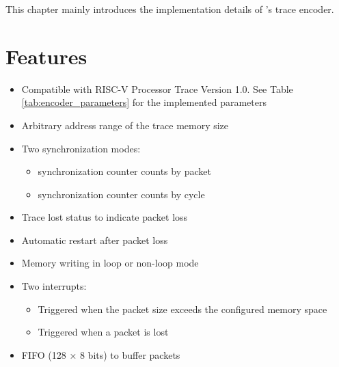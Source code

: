 \documentclass[main\_\_EN.tex]{subfiles}
\begin{document}
This chapter mainly introduces the implementation details of \chipname{}'s trace encoder.


\section{Features}
\label{sec:riscvtracenc-features}

\begin{itemize}
    \item Compatible with RISC-V Processor Trace Version 1.0. See Table \ref{tab:encoder_parameters} for the implemented parameters
    \item Arbitrary address range of the trace memory size
    \item Two synchronization modes:
        \begin{itemize}
            \item synchronization counter counts by packet
            \item synchronization counter counts by cycle
        \end{itemize}
    \item Trace lost status to indicate packet loss
    \item Automatic restart after packet loss
    \item Memory writing in loop or non-loop mode
    \item Two interrupts:
        \begin{itemize}
            \item Triggered when the packet size exceeds the configured memory space
            \item Triggered when a packet is lost
        \end{itemize}
    \item FIFO (128 × 8 bits) to buffer packets
\end{itemize}
\end{document}
